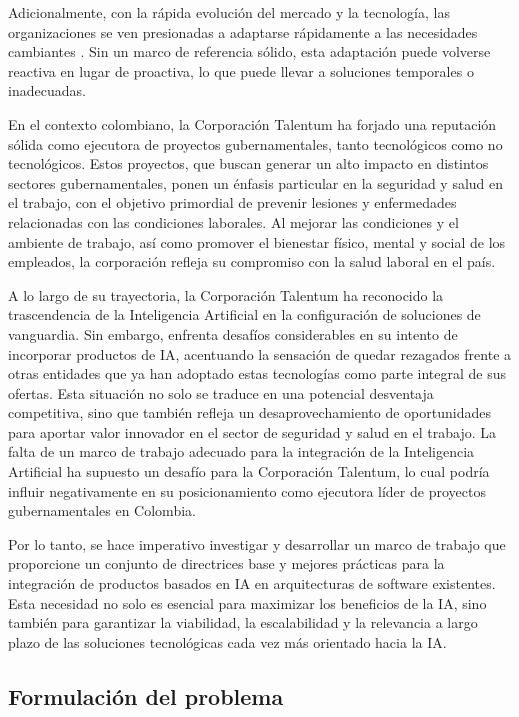 Adicionalmente, con la rápida evolución del mercado y la tecnología, las organizaciones se ven presionadas a adaptarse rápidamente a las necesidades cambiantes \citep{Wang2016ImplementingOutlook}. Sin un marco de referencia sólido, esta adaptación puede volverse reactiva en lugar de proactiva, lo que puede llevar a soluciones temporales o inadecuadas.

En el contexto colombiano, la Corporación Talentum ha forjado una reputación sólida como ejecutora de proyectos gubernamentales, tanto tecnológicos como no tecnológicos. Estos proyectos, que buscan generar un alto impacto en distintos sectores gubernamentales, ponen un énfasis particular en la seguridad y salud en el trabajo, con el objetivo primordial de prevenir lesiones y enfermedades relacionadas con las condiciones laborales. Al mejorar las condiciones y el ambiente de trabajo, así como promover el bienestar físico, mental y social de los empleados, la corporación refleja su compromiso con la salud laboral en el país.

A lo largo de su trayectoria, la Corporación Talentum ha reconocido la trascendencia de la Inteligencia Artificial en la configuración de soluciones de vanguardia. Sin embargo, enfrenta desafíos considerables en su intento de incorporar productos de IA, acentuando la sensación de quedar rezagados frente a otras entidades que ya han adoptado estas tecnologías como parte integral de sus ofertas. Esta situación no solo se traduce en una potencial desventaja competitiva, sino que también refleja un desaprovechamiento de oportunidades para aportar valor innovador en el sector de seguridad y salud en el trabajo. La falta de un marco de trabajo adecuado para la integración de la Inteligencia Artificial ha supuesto un desafío para la Corporación Talentum, lo cual podría influir negativamente en su posicionamiento como ejecutora líder de proyectos gubernamentales en Colombia.

Por lo tanto, se hace imperativo investigar y desarrollar un marco de trabajo que proporcione un conjunto de directrices base y mejores prácticas para la integración de productos basados en IA en arquitecturas de software existentes. Esta necesidad no solo es esencial para maximizar los beneficios de la IA, sino también para garantizar la viabilidad, la escalabilidad y la relevancia a largo plazo de las soluciones tecnológicas cada vez más orientado hacia la IA.

\subsection{Formulación del problema}

